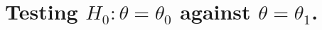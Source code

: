 \chapter{Testing \texorpdfstring{$H_0 : \theta = \theta_0$}{H0} against \texorpdfstring{$\theta =
\theta_1$}{equality}.}

